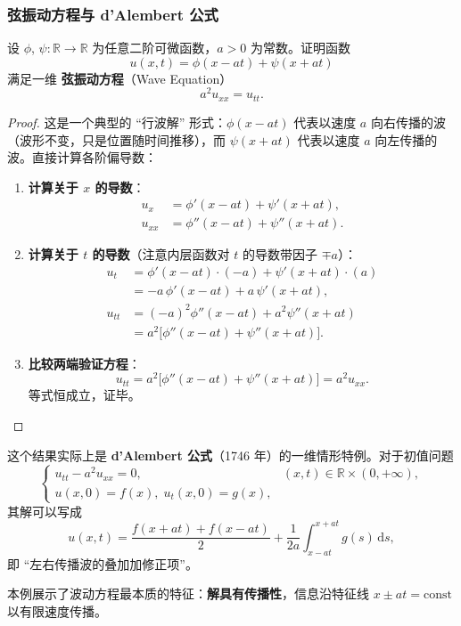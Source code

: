 \documentclass[lang=cn,11pt]{elegantbook}
\begin{document}
\subsubsection*{弦振动方程与 d'Alembert 公式}

\begin{example}[一维波动方程的通解验证] \label{ex:wave-dalembert}
设 $\phi$, $\psi:\mathbb R\to\mathbb R$ 为任意二阶可微函数，$a>0$ 为常数。证明函数
\[
u(x,t)=\phi(x-at)+\psi(x+at)
\]
满足一维 \textbf{弦振动方程}（Wave Equation）
\[
a^2u_{xx}=u_{tt}.
\]
\end{example}

\begin{proof}
这是一个典型的 ``行波解'' 形式：$\phi(x-at)$ 代表以速度 $a$ 向右传播的波（波形不变，只是位置随时间推移），而 $\psi(x+at)$ 代表以速度 $a$ 向左传播的波。直接计算各阶偏导数：

\begin{enumerate}
  \item \textbf{计算关于 $x$ 的导数}：
  \begin{align*}
  u_x&=\phi'(x-at)+\psi'(x+at),\\[4pt]
  u_{xx}&=\phi''(x-at)+\psi''(x+at).
  \end{align*}

  \item \textbf{计算关于 $t$ 的导数}（注意内层函数对 $t$ 的导数带因子 $\mp a$）：
  \begin{align*}
  u_t&=\phi'(x-at)\cdot(-a)+\psi'(x+at)\cdot(a)\\[4pt]
  &=-a\,\phi'(x-at)+a\,\psi'(x+at),\\[8pt]
  u_{tt}&=(-a)^2\phi''(x-at)+a^2\psi''(x+at)\\[4pt]
  &=a^2\bigl[\phi''(x-at)+\psi''(x+at)\bigr].
  \end{align*}

  \item \textbf{比较两端验证方程}：
  \[
  u_{tt}=a^2\!\bigl[\phi''(x-at)+\psi''(x+at)\bigr]=a^2u_{xx}.
  \]
  等式恒成立，证毕。
\end{enumerate}
\end{proof}

\begin{note}
这个结果实际上是 \textbf{d'Alembert 公式}（1746 年）的一维情形特例。对于初值问题
\[
\begin{cases}
u_{tt}-a^2u_{xx}=0,&(x,t)\in\mathbb R\times(0,+\infty),\\
u(x,0)=f(x),\;u_t(x,0)=g(x),
\end{cases}
\]
其解可以写成
\[
u(x,t)=\frac{f(x+at)+f(x-at)}{2}+\frac{1}{2a}\int_{x-at}^{x+at}g(s)\,\mathrm{d}s,
\]
即 ``左右传播波的叠加加修正项''。

本例展示了波动方程最本质的特征：\textbf{解具有传播性}，信息沿特征线 $x\pm at=\mathrm{const}$ 以有限速度传播。
\end{note}
\end{document}
